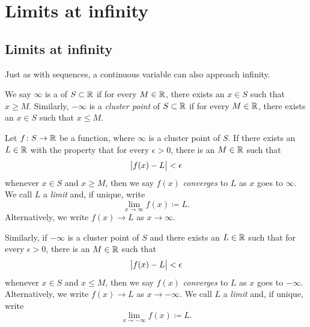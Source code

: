 
\sectionnewpage
\section{Limits at infinity}
\label{sec:limitatinf}



\subsection{Limits at infinity}

Just as with sequences, a continuous variable can also approach infinity.

\begin{defn}
We say $\infty$ is a \emph{} of $S \subset {\mathbb{R}}$ if for every
$M \in {\mathbb{R}}$, there exists an $x \in S$ such that $x \geq M$.  Similarly,
$- \infty$ is a \emph{cluster point} of $S \subset {\mathbb{R}}$ if for every
$M \in {\mathbb{R}}$, there exists an $x \in S$ such that $x \leq M$.

%
Let $f \colon S \to {\mathbb{R}}$ be a function, where 
$\infty$ is a cluster point of $S$.
If there exists an $L \in {\mathbb{R}}$
with the property
that for every $\epsilon > 0$, there is an $M \in {\mathbb{R}}$ such that
\begin{equation*}
\bigl\lvert {f(x) - L} \bigr\rvert < \epsilon 
\end{equation*}
whenever $x \in S$ and $x \geq M$, then we say $f(x)$
\emph{converges} to $L$
as $x$ goes to $\infty$.  We call $L$ a \emph{limit}
and, if unique, write
\begin{equation*}
\lim_{x \to \infty} f(x) \coloneqq L .
\end{equation*}
Alternatively, we write $f(x) \to L$ as $x \to \infty$.

Similarly, if $-\infty$ is a cluster point of $S$
and
there exists an $L \in {\mathbb{R}}$
such that for every $\epsilon > 0$, there is an $M \in {\mathbb{R}}$ such that
\begin{equation*}
\bigl\lvert {f(x) - L} \bigr\rvert < \epsilon 
\end{equation*}
whenever $x \in S$ and $x \leq M$, then we say $f(x)$ \emph{converges} to $L$
as $x$ goes to $-\infty$.
Alternatively, we write $f(x) \to L$ as $x \to -\infty$.
We call $L$ a \emph{limit} and, if unique, write
\begin{equation*}
\lim_{x \to -\infty} f(x) \coloneqq L .
\end{equation*}
\end{defn}

